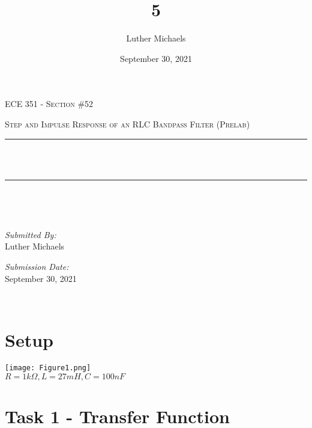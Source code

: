 \documentclass[12pt]{report}
\title{5}	%
\author{Luther Michaels}	%
\date{September 30, 2021}   %
\makeatletter
\let\thetitle\@title
\makeatother
\begin{document}
	
\begin{titlepage}
	\centering
	\vspace*{0.5 cm}
	
	\begin{center}    
		\textsc{\Large   ECE 351 - Section \#52}\\[2.0 cm]	
	\end{center}  
	\textsc{\Large Step and Impulse Response of an RLC Bandpass Filter (Prelab)  }\\[0.5 cm]
	\rule{\linewidth}{0.2 mm} \\[0.4 cm]
	{ \huge \bfseries \thetitle}\\
	\rule{\linewidth}{0.2 mm} \\[1.5 cm]
	\begin{minipage}{0.4\textwidth}
		\begin{flushleft} \large
		\end{flushleft}
	\end{minipage}~
	\begin{minipage}{0.4\textwidth}
		\begin{flushright} \large
			\emph{Submitted By:} \\
			Luther Michaels \break
			
			\emph{Submission Date:} \\
			September 30, 2021
		\end{flushright}
	\end{minipage}\\[2 cm]
\end{titlepage}
	
\renewcommand{\thesection}{\arabic{section}}

\section{Setup}

\begin{center}
	\texttt{[image: Figure1.png]}\\[0.1 cm]
	$ R = 1 k\Omega, L = 27 mH, C = 100 nF $
\end{center}

	
\section{Task 1 - Transfer Function}
	
\end{document}
